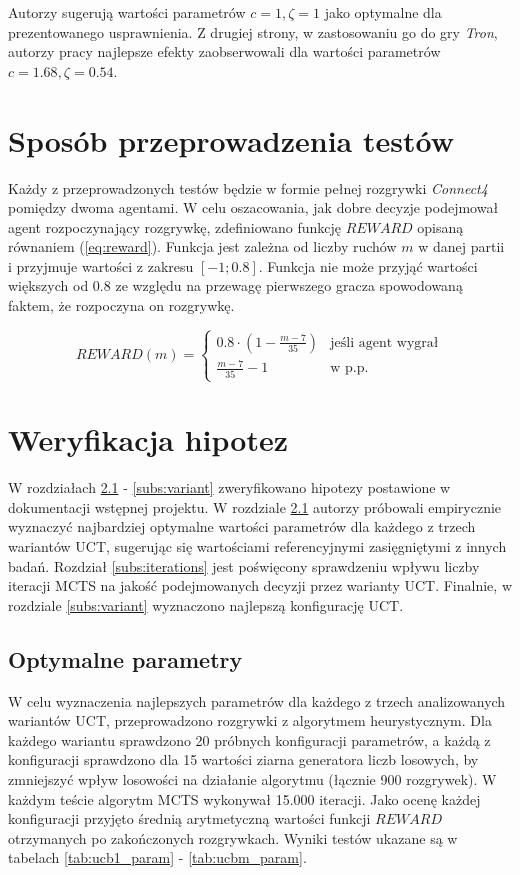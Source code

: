 \documentclass[a4paper,12pt]{article}
\let\oldsection\section
\renewcommand\section{\clearpage\oldsection}
\newcommand{\twopartdef}[3]
{
	\left\{
	\begin{array}{ll}
		#1 & \mbox{jeśli agent wygrał} #2 \\
		#3 & \mbox{w p.p. } 
	\end{array}
	\right.
}
\begin{document}
Autorzy \cite{ucbv} sugerują wartości parametrów $c=1, \zeta=1$ jako optymalne dla prezentowanego usprawnienia. Z drugiej strony, w zastosowaniu go do gry \textit{Tron}, autorzy pracy \cite{tron} najlepsze efekty zaobserwowali dla wartości parametrów $c=1.68, \zeta = 0.54$.


\section{Sposób przeprowadzenia testów}
Każdy z przeprowadzonych testów będzie w formie pełnej rozgrywki \textit{Connect4} pomiędzy dwoma agentami. W celu oszacowania, jak dobre decyzje podejmował agent rozpoczynający rozgrywkę, zdefiniowano funkcję $REWARD$ opisaną równaniem (\ref{eq:reward}). Funkcja jest zależna od liczby ruchów $m$ w danej partii i przyjmuje wartości z zakresu $[-1; 0.8]$. Funkcja nie może przyjąć wartości większych od $0.8$ ze względu na przewagę pierwszego gracza spowodowaną faktem, że rozpoczyna on rozgrywkę.

\begin{equation} \label{eq:reward}
	REWARD(m) = \twopartdef { 0.8 \cdot (1 - \frac{m-7}{35}) } {} {\frac{m-7}{35} - 1}
\end{equation}


\section{Weryfikacja hipotez}
W rozdziałach \ref{subs:params} - \ref{subs:variant} zweryfikowano hipotezy postawione w dokumentacji wstępnej projektu. W rozdziale \ref{subs:params} autorzy próbowali empirycznie wyznaczyć najbardziej optymalne wartości parametrów dla każdego z trzech wariantów UCT, sugerując się wartościami referencyjnymi zasięgniętymi z innych badań. Rozdział \ref{subs:iterations} jest poświęcony sprawdzeniu wpływu liczby iteracji MCTS na jakość podejmowanych decyzji przez warianty UCT. Finalnie, w rozdziale \ref{subs:variant} wyznaczono najlepszą konfigurację UCT.


\subsection{Optymalne parametry} \label{subs:params}
W celu wyznaczenia najlepszych parametrów dla każdego z trzech analizowanych wariantów UCT, przeprowadzono rozgrywki z algorytmem heurystycznym. Dla każdego wariantu sprawdzono 20 próbnych konfiguracji parametrów, a każdą z konfiguracji sprawdzono dla 15 wartości ziarna generatora liczb losowych, by zmniejszyć wpływ losowości na działanie algorytmu (łącznie 900 rozgrywek). W każdym teście algorytm MCTS wykonywał 15.000 iteracji. Jako ocenę każdej konfiguracji przyjęto średnią arytmetyczną wartości funkcji $REWARD$ otrzymanych po zakończonych rozgrywkach. Wyniki testów ukazane są w tabelach \ref{tab:ucb1_param} - \ref{tab:ucbm_param}.
\end{document}
